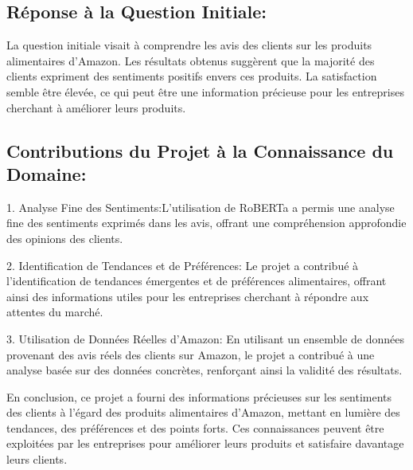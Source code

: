 

\subsection{Réponse à la Question Initiale:}

La question initiale visait à comprendre les avis des clients sur les produits alimentaires d'Amazon. Les résultats obtenus suggèrent que la majorité des clients expriment des sentiments positifs envers ces produits. La satisfaction semble être élevée, ce qui peut être une information précieuse pour les entreprises cherchant à améliorer leurs produits.

\subsection{Contributions du Projet à la Connaissance du Domaine:}

1. Analyse Fine des Sentiments:L'utilisation de RoBERTa a permis une analyse fine des sentiments exprimés dans les avis, offrant une compréhension approfondie des opinions des clients.

2. Identification de Tendances et de Préférences: Le projet a contribué à l'identification de tendances émergentes et de préférences alimentaires, offrant ainsi des informations utiles pour les entreprises cherchant à répondre aux attentes du marché.

3. Utilisation de Données Réelles d'Amazon: En utilisant un ensemble de données provenant des avis réels des clients sur Amazon, le projet a contribué à une analyse basée sur des données concrètes, renforçant ainsi la validité des résultats.

En conclusion, ce projet a fourni des informations précieuses sur les sentiments des clients à l'égard des produits alimentaires d'Amazon, mettant en lumière des tendances, des préférences et des points forts. Ces connaissances peuvent être exploitées par les entreprises pour améliorer leurs produits et satisfaire davantage leurs clients.